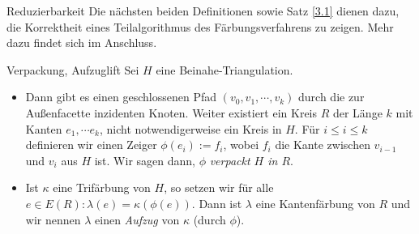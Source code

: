 \begin{section}{Reduzierbarkeit}
 Die nächsten beiden Definitionen sowie Satz \ref{3.1} dienen dazu, die Korrektheit eines Teilalgorithmus des Färbungsverfahrens zu zeigen. Mehr dazu findet sich im Anschluss.
 
 \begin{definitionl}{Verpackung, Aufzug}{lift}
  Sei $H$ eine Beinahe-Triangulation. 
  \begin{itemize}
   \item Dann gibt es einen geschlossenen Pfad $(v_0,v_1,\cdots,v_k)$ durch die zur Außenfacette inzidenten Knoten. Weiter existiert ein Kreis $R$ der Länge $k$ mit Kanten $e_1,\cdots e_k$, nicht notwendigerweise ein Kreis in $H$. Für $i \leq i \leq k$ definieren wir einen Zeiger $\phi(e_i) := f_i$, wobei $f_i$ die Kante zwischen $v_{i-1}$ und $v_i$ aus $H$ ist. Wir sagen dann, $\phi$ \textit{verpackt $H$ in $R$}. 
   \item Ist $\kappa$ eine Trifärbung von $H$, so setzen wir für alle $e \in E(R): \lambda(e) = \kappa(\phi(e))$. Dann ist $\lambda$ eine Kantenfärbung von $R$ und wir nennen $\lambda$ einen \textit{Aufzug} von $\kappa$ (durch $\phi$).
  \end{itemize}
 \end{definitionl}
 

\end{section}
